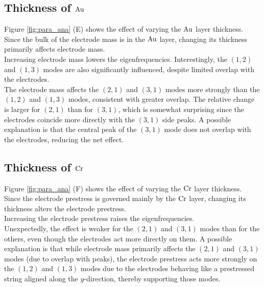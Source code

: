 \subsection{Thickness of $\mathrm{Au}$}
Figure \ref{fig:para_ana} (E) shows the effect of varying the $\mathrm{Au}$ layer thickness.\\
Since the bulk of the electrode mass is in the $\mathrm{Au}$ layer, changing its thickness primarily affects electrode mass.\\
Increasing electrode mass lowers the eigenfrequencies. Interestingly, the $(1,2)$ and $(1,3)$ modes are also significantly influenced, despite limited overlap with the electrodes.\\
The electrode mass affects the $(2,1)$ and $(3,1)$ modes more strongly than the $(1,2)$ and $(1,3)$ modes, consistent with greater overlap. The relative change is larger for $(2,1)$ than for $(3,1)$, which is somewhat surprising since the electrodes coincide more directly with the $(3,1)$ side peaks. A possible explanation is that the central peak of the $(3,1)$ mode does not overlap with the electrodes, reducing the net effect.\\

\subsection{Thickness of $\mathrm{Cr}$}
Figure \ref{fig:para_ana} (F) shows the effect of varying the $\mathrm{Cr}$ layer thickness.\\
Since the electrode prestress is governed mainly by the $\mathrm{Cr}$ layer, changing its thickness alters the electrode prestress.\\
Increasing the electrode prestress raises the eigenfrequencies.\\
Unexpectedly, the effect is weaker for the $(2,1)$ and $(3,1)$ modes than for the others, even though the electrodes act more directly on them. A possible explanation is that while electrode mass primarily affects the $(2,1)$ and $(3,1)$ modes (due to overlap with peaks), the electrode prestress acts more strongly on the $(1,2)$ and $(1,3)$ modes due to the electrodes behaving like a prestressed string aligned along the $y$-direction, thereby supporting those modes.\\

\newpage

